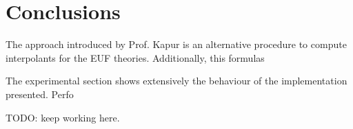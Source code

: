 \section{Conclusions}

The approach introduced by Prof. Kapur
is an alternative procedure to compute interpolants
for the EUF theories. Additionally, this formulas

The experimental section shows extensively the 
behaviour of the implementation presented. Perfo

TODO: keep working here.

